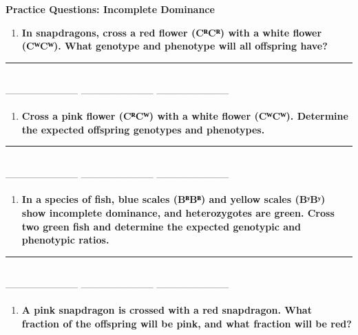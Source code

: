 \documentclass[
  letterpaper,
  DIV=11,
  numbers=noendperiod]{scrreprt}
\providecommand{\tightlist}{%
  \setlength{\itemsep}{0pt}\setlength{\parskip}{0pt}}
\begin{document}
\textbf{Practice Questions: Incomplete Dominance}

\begin{enumerate}
\def\labelenumi{\arabic{enumi}.}
\tightlist
\item
  \textbf{In snapdragons, cross a red flower (CᴿCᴿ) with a white flower
  (CᵂCᵂ). What genotype and phenotype will all offspring have?}
\end{enumerate}

\begin{center}\rule{0.5\linewidth}{0.5pt}\end{center}

\textbf{~~}\\
----------------------- ----------------------- -----------------------

\begin{enumerate}
\def\labelenumi{\arabic{enumi}.}
\setcounter{enumi}{1}
\tightlist
\item
  \textbf{Cross a pink flower (CᴿCᵂ) with a white flower (CᵂCᵂ).
  Determine the expected offspring genotypes and phenotypes.}
\end{enumerate}

\begin{center}\rule{0.5\linewidth}{0.5pt}\end{center}

\textbf{~~}\\
----------------------- ----------------------- -----------------------

\begin{enumerate}
\def\labelenumi{\arabic{enumi}.}
\setcounter{enumi}{2}
\tightlist
\item
  \textbf{In a species of fish, blue scales (BᴮBᴮ) and yellow scales
  (BʸBʸ) show incomplete dominance, and heterozygotes are green. Cross
  two green fish and determine the expected genotypic and phenotypic
  ratios.}
\end{enumerate}

\begin{center}\rule{0.5\linewidth}{0.5pt}\end{center}

\textbf{~~}\\
----------------------- ----------------------- -----------------------

\begin{enumerate}
\def\labelenumi{\arabic{enumi}.}
\setcounter{enumi}{3}
\tightlist
\item
  \textbf{A pink snapdragon is crossed with a red snapdragon. What
  fraction of the offspring will be pink, and what fraction will be
  red?}
\end{enumerate}
\end{document}
